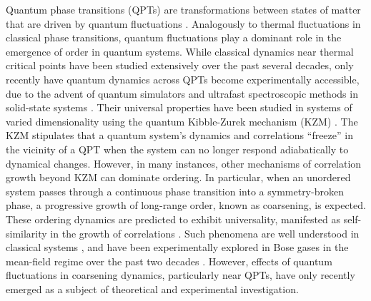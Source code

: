 \documentclass[reprint,twocolumn,secnumarabic,amssymb, aps, prx]{revtex4-2}
\begin{document}
\maketitle



Quantum phase transitions (QPTs) are transformations between states of matter that are driven by quantum fluctuations \cite{sachdev2011quantum}. Analogously to thermal fluctuations in classical phase transitions, quantum fluctuations play a dominant role in 
the emergence of order in quantum systems. 
While classical dynamics near thermal critical points have been studied extensively over the past several decades, only recently have quantum  dynamics across QPTs become experimentally accessible, due to the advent of quantum simulators \cite{bakr2010probing,keesling2019quantum,ebadi2021quantum,scholl2021quantum} and ultrafast spectroscopic methods in solid-state systems \cite{ruegg2008quantum,pekker2015amplitude,jain2017higgs,shimano2020higgs}. Their universal properties have been studied in systems of varied dimensionality using the 
quantum Kibble-Zurek mechanism (KZM) \cite{pyka2013topological,keesling2019quantum,ebadi2021quantum}. 
The KZM stipulates that a quantum system's dynamics and correlations ``freeze''
in the vicinity of a QPT when the system can no longer respond adiabatically to dynamical changes. 
However, in many instances, other mechanisms of correlation growth beyond KZM can dominate ordering\cite{biroli2010kibble,roychowdhury2021dynamics,king2022coherent,schmitt2022quantum,zeng2023universal}.  
In particular, when an unordered system passes through a continuous phase transition into a symmetry-broken phase, a progressive growth of long-range order, known as coarsening, is expected.
These ordering dynamics are predicted to exhibit universality, manifested as self-similarity in the growth of correlations \cite{lifshitz1962kinetics,hohenberg1977critical,Bray1994}.
Such phenomena are well understood in classical systems \cite{Bray1994}, and have been experimentally explored in Bose gases in the mean-field regime over the past two decades \cite{sadler2006spontaneous,PhysRevX.8.021070,prufer2018observation,erne2018universal,goo2022universal,gazo2023universal,huh2024universality}. However, effects of quantum fluctuations in coarsening dynamics, particularly near QPTs, have only recently emerged as a subject of  theoretical \cite{chandran2012kibble,chandran2013equilibration,maraga2015aging,gagel2015universal,Samajdar2024} and experimental \cite{andersen2024thermalization} investigation.
\end{document}
